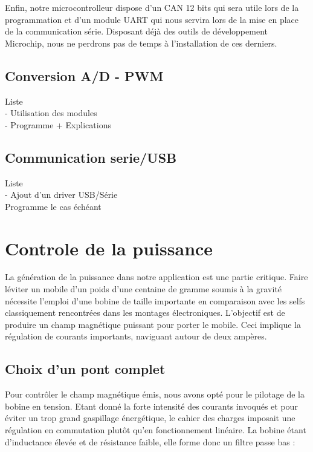 \documentclass[11pt, french]{article} %
\begin{document}
Enfin, notre microcontrolleur dispose d'un CAN 12 bits qui sera utile lors de la programmation et d'un module UART qui nous servira lors de la mise en place de la communication série. Disposant déjà des outils de développement Microchip, nous ne perdrons pas de temps à l'installation de ces derniers. 



\subsection{Conversion A/D - PWM}
Liste
\\- Utilisation des modules
\\- Programme + Explications

\subsection{Communication serie/USB}
Liste
\\- Ajout d'un driver USB/Série
\\ Programme le cas échéant

\section{Controle de la puissance}

	La génération de la puissance dans notre application est une partie critique. Faire léviter un mobile d'un poids d'une centaine de gramme soumis à la gravité nécessite l'emploi d'une bobine de taille importante en comparaison avec les selfs classiquement rencontrées dans les montages électroniques. L'objectif est de produire un champ magnétique puissant pour porter le mobile. Ceci implique la régulation de courants importants, naviguant autour de deux ampères. 

\subsection{Choix d'un pont complet}
	Pour contrôler le champ magnétique émis, nous avons opté pour le pilotage de la bobine en tension. Etant donné la forte intensité des courants invoqués et pour éviter un trop grand gaspillage énergétique, le cahier des charges imposait une régulation en commutation plutôt qu'en fonctionnement linéaire. La bobine étant d'inductance élevée et de résistance faible, elle forme donc un filtre passe bas :
\end{document}
